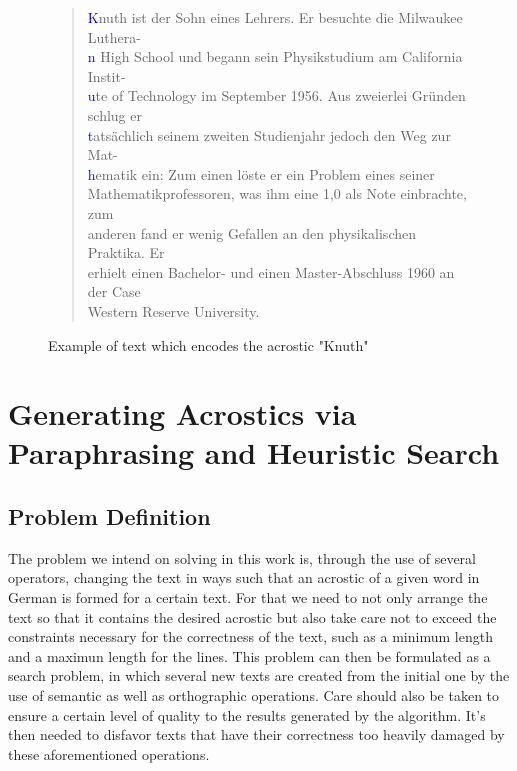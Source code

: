 \documentclass[11pt]{reportAlternative}
\begin{document}
\begin{figure}[H]
	\begin{quote}
 \textcolor{Blue}{K}nuth ist der Sohn eines Lehrers. Er besuchte die Milwaukee Luthera- \\
	\textcolor{Blue}{n} High School und begann sein Physikstudium am California Instit- \\
	\textcolor{Blue}{u}te of Technology im September 1956. Aus zweierlei Gründen schlug er \\
	\textcolor{Blue}{t}atsächlich seinem zweiten Studienjahr jedoch den Weg zur Mat-\\
	\textcolor{Blue}{h}ematik ein: Zum einen löste er ein Problem eines seiner \\
	Mathematikprofessoren, was ihm eine 1,0 als Note einbrachte, zum \\
	anderen fand er wenig Gefallen an den physikalischen Praktika. Er \\
	erhielt einen Bachelor- und einen Master-Abschluss 1960 an der Case \\
	Western Reserve University. 

	\end{quote}
	\caption{Example of text which encodes the acrostic "Knuth"}
\end{figure}

\chapter{Generating Acrostics via Paraphrasing and Heuristic Search}

\section{Problem Definition}
The problem we intend on solving in this work is, through the use of several operators, changing the text in ways such that an acrostic of a given word in German is formed for a certain text. For that we need to not only arrange the text so that it contains the desired acrostic but also take care not to exceed the constraints necessary for the correctness of the text, such as a minimum length and a maximun length for the lines. This problem can then be formulated as a search problem, in which several new texts are created from the initial one by the use of semantic as well as orthographic operations.  Care should also be taken to ensure a certain level of quality to the results generated by the algorithm. It's then needed to disfavor texts that have their correctness too heavily damaged by these aforementioned operations.
\end{document}
